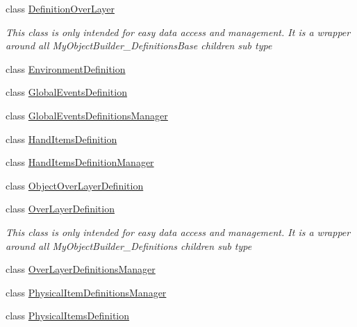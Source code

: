 \begin{DoxyCompactItemize}
\item 
class \hyperlink{class_s_e_mod_a_p_i_1_1_a_p_i_1_1_definitions_1_1_definition_over_layer}{Definition\+Over\+Layer}
\begin{DoxyCompactList}\small\item\em This class is only intended for easy data access and management. It is a wrapper around all My\+Object\+Builder\+\_\+\+Definitions\+Base children sub type \end{DoxyCompactList}\item 
class \hyperlink{class_s_e_mod_a_p_i_1_1_a_p_i_1_1_definitions_1_1_environment_definition}{Environment\+Definition}
\item 
class \hyperlink{class_s_e_mod_a_p_i_1_1_a_p_i_1_1_definitions_1_1_global_events_definition}{Global\+Events\+Definition}
\item 
class \hyperlink{class_s_e_mod_a_p_i_1_1_a_p_i_1_1_definitions_1_1_global_events_definitions_manager}{Global\+Events\+Definitions\+Manager}
\item 
class \hyperlink{class_s_e_mod_a_p_i_1_1_a_p_i_1_1_definitions_1_1_hand_items_definition}{Hand\+Items\+Definition}
\item 
class \hyperlink{class_s_e_mod_a_p_i_1_1_a_p_i_1_1_definitions_1_1_hand_items_definition_manager}{Hand\+Items\+Definition\+Manager}
\item 
class \hyperlink{class_s_e_mod_a_p_i_1_1_a_p_i_1_1_definitions_1_1_object_over_layer_definition}{Object\+Over\+Layer\+Definition}
\item 
class \hyperlink{class_s_e_mod_a_p_i_1_1_a_p_i_1_1_definitions_1_1_over_layer_definition}{Over\+Layer\+Definition}
\begin{DoxyCompactList}\small\item\em This class is only intended for easy data access and management. It is a wrapper around all My\+Object\+Builder\+\_\+\+Definitions children sub type \end{DoxyCompactList}\item 
class \hyperlink{class_s_e_mod_a_p_i_1_1_a_p_i_1_1_definitions_1_1_over_layer_definitions_manager}{Over\+Layer\+Definitions\+Manager}
\item 
class \hyperlink{class_s_e_mod_a_p_i_1_1_a_p_i_1_1_definitions_1_1_physical_item_definitions_manager}{Physical\+Item\+Definitions\+Manager}
\item 
class \hyperlink{class_s_e_mod_a_p_i_1_1_a_p_i_1_1_definitions_1_1_physical_items_definition}{Physical\+Items\+Definition}
\item 

\end{DoxyCompactItemize}
